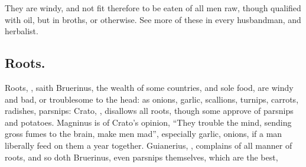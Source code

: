 
They are windy, and not fit therefore to be eaten of all
men raw, though qualified with oil, but in broths, or otherwise. See more of
these in every husbandman, and herbalist.

\subsection{Roots.}
Roots, , saith Bruerinus, the wealth of
some countries, and sole food, are windy and bad, or troublesome to the head:
as onions, garlic, scallions, turnips, carrots, radishes, parsnips: Crato,
, disallows all roots, though
some approve of parsnips and potatoes.
Magninus is of Crato's opinion, \enquote{They
trouble the mind, sending gross fumes to the brain, make men mad}, especially
garlic, onions, if a man liberally feed on them a year together. Guianerius,
, complains of all manner of roots, and
so doth Bruerinus, even parsnips themselves, which are the best,

